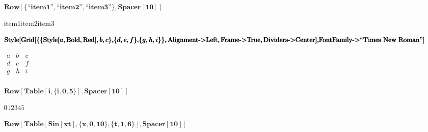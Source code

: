 \documentclass{article}
\begin{document}
\begin{doublespace}
\noindent\(\pmb{\text{Row}[\{\text{{``}item1{''}},\text{{``}item2{''}},\text{{``}item3{''}}\},\text{Spacer}[10]]}\)
\end{doublespace}

\begin{doublespace}
\noindent\(\text{item1}\text{item2}\text{item3}\)
\end{doublespace}

\begin{doublespace}
\noindent\(\pmb{\text{Style}[\text{Grid}[\{}\\
\pmb{\{\text{Style}[a,\text{Bold},\text{Red}],b,c\},}\\
\pmb{\{d,e,f\},}\\
\pmb{\{g,h,i\}}\\
\pmb{\},\text{Alignment}\text{-$>$}\text{Left},\text{Frame}\text{-$>$}\text{True},\text{Dividers}\text{-$>$}\text{Center}],}\\
\pmb{\text{FontFamily}\text{-$>$}\text{{``}Times New Roman{''}}]}\)
\end{doublespace}

\begin{doublespace}
\noindent\(\begin{array}{l|ll}
 a & b & c \\
\hline
 d & e & f \\
 g & h & i \\
\end{array}\)
\end{doublespace}

\begin{doublespace}
\noindent\(\pmb{\text{Row}[\text{Table}[i,\{i,0,5\}],\text{Spacer}[10]]}\)
\end{doublespace}

\begin{doublespace}
\noindent\(012345\)
\end{doublespace}

\begin{doublespace}
\noindent\(\pmb{\text{Row}[\text{Table}[\text{Sin}[x t],\{x,0,10\},\{t,1,6\}],\text{Spacer}[10]]}\)
\end{doublespace}
\end{document}

